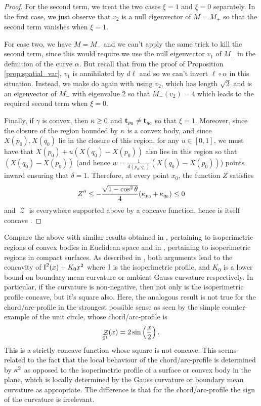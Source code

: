 \documentclass[11pt]{amsart}
\DeclareMathOperator{\chordarcprofile}{\mathcal{Z}}
\begin{document}
\begin{proof}
For the second term, we treat the two cases $\xi=1$ and $\xi=0$ separately. In the first case, we just observe that $v_2$ is a null eigenvector of $M=M_+$ so that the second term vanishes when $\xi=1$. 

For case two, we have $M=M_-$ and we can't apply the same trick to kill the second term, since this would require we use the null eigenvector $v_1$ of $M_-$ in the definition of the curve $\alpha$. But recall that from the proof of Proposition \ref{prop:spatial_var}, $v_1$ is annihilated by $d\ell$ and so we can't invert $\ell\circ\alpha$ in this situation. Instead, we make do again with using $v_2$, which has length $\sqrt{2}$ and is an eigenvector of $M_-$ with eigenvalue $2$ so that $M_- (v_2) = 4$ which leads to the required second term when $\xi=0$.

Finally, if $\gamma$ is convex, then $\operatorname{\kappa} \geq 0$ and $\operatorname{\mathbf{t}}_{p_0} \ne \operatorname{\mathbf{t}}_{q_0}$ so that $\xi = 1$. Moreover, since the closure of the region bounded by $\operatorname{\kappa}$ is a convex body, and since $X(p_0), X(q_0)$ lie in the closure of this region, for any $u \in [0,1]$, we must have that $X(p_0) + u(X(q_0) - X(p_0))$ also lies in this region so that $(X(q_0) - X(p_0))$ (and hence $w = \tfrac{1}{d(p_0,q_0)} (X(q_0) - X(p_0))$) points inward ensuring that $\delta = 1$. Therefore, at every point $x_0$, the function $Z$ satisfies
\[
Z'' \leq - \frac{\sqrt{1-\cos^2 \theta}}{4} (\operatorname{\kappa}_{p_0} + \operatorname{\kappa}_{q_0}) \leq 0
\]
and $\chordarcprofile$ is everywhere supported above by a concave function, hence is itself concave \cite{MR1674097}.
\end{proof}

\begin{remark}
Compare the above with similar results obtained in \cite{MR1674097}, pertaining to isoperimetric regions of convex bodies in Euclidean space and in \cite{MR875084}, pertaining to isoperimetric regions in compact surfaces. As described in \cite{pbthesis}, both arguments lead to the concavity of $\operatorname{I}^2(x) + K_0 x^2$ where $\operatorname{I}$ is the isoperimetric profile, and $K_0$ is a lower bound on boundary mean curvature or ambient Gauss curvature respectively. In particular, if the curvature is non-negative, then not only is the isoperimetric profile concave, but it's square also. Here, the analogous result is not true for the chord/arc-profile in the strongest possible sense as seen by the simple counter-example of the unit circle, whose chord/arc-profile is 
\[
\chordarcprofile_{\sphere^1} (x) = 2 \sin \left(\frac{x}{2}\right).
\]
This is a strictly concave function whose square is not concave. This seems related to the fact that the local behaviour of the chord/arc-profile is determined by $\operatorname{\kappa}^2$ as opposed to the isoperimetric profile of a surface or convex body in the plane, which is locally determined by the Gauss curvature or boundary mean curvature as appropriate. The difference is that for the chord/arc-profile the sign of the curvature is irrelevant.
\end{remark}
\end{document}

